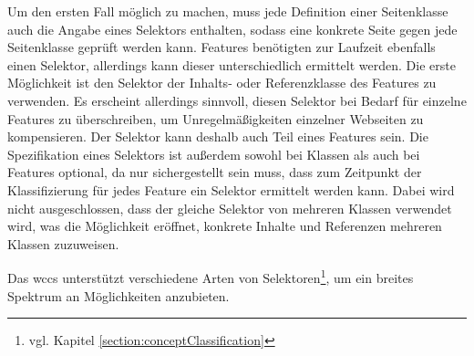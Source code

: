         Um den ersten Fall möglich zu machen,
        muss jede Definition einer Seitenklasse auch die Angabe eines Selektors enthalten,
        sodass eine konkrete Seite gegen jede Seitenklasse geprüft werden kann.
        Features benötigten zur Laufzeit ebenfalls einen Selektor,
        allerdings kann dieser unterschiedlich ermittelt werden.
        Die erste Möglichkeit ist den Selektor der Inhalts- oder
        Referenzklasse des Features zu verwenden.
        Es erscheint allerdings sinnvoll, diesen Selektor bei Bedarf für einzelne Features
        zu überschreiben, um Unregelmäßigkeiten einzelner Webseiten zu kompensieren.
        Der Selektor kann deshalb auch Teil eines Features sein.
        Die Spezifikation eines Selektors ist außerdem sowohl
        bei Klassen als auch bei Features optional,
        da nur sichergestellt sein muss, dass zum Zeitpunkt der Klassifizierung für jedes
        Feature ein Selektor ermittelt werden kann.        
        Dabei wird nicht ausgeschlossen, dass der gleiche Selektor von mehreren Klassen verwendet wird,
        was die Möglichkeit eröffnet, konkrete Inhalte und Referenzen mehreren Klassen zuzuweisen.

        Das \gls{wccs} unterstützt verschiedene Arten von
        Selektoren\footnote{vgl. Kapitel \ref{section:conceptClassification}},
        um ein breites Spektrum an Möglichkeiten anzubieten.
